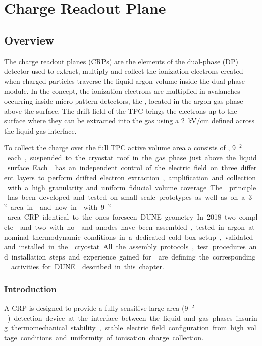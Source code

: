 \chapter{Charge Readout Plane}
\label{ch:dp-crp}
\section{Overview}
\label{ch:dp-crp-ov}

The charge readout planes (CRPs) are the elements of the dual-phase (DP) detector used to extract, multiply and collect the ionization electrons created when charged particles traverse the liquid argon volume inside the dual phase module.
In the \dual \lartpc concept, the ionization electrons are multiplied in avalanches  occurring inside micro-pattern detectors, the , located in the argon gas phase above the \lar  surface. The drift field of the TPC brings the electrons up to the \lar surface where they can  be    extracted into the gas using a \SI{2}{kV/cm} \efield defined across the liquid-gas interface.

To collect the charge over the full TPC active volume area a \dpmod consists of \dptotcrp {}, \SI{9}{\m$^{2}$}each,  suspended to the cryostat roof in the gas phase just  above the liquid surface. Each  has an independent control of the electric field on three different layers to perform drifted electron extraction, amplification and collection with a high granularity and uniform fiducial volume coverage.
The principle has been developed and tested on small scale prototypes as well as on a \SI{3}{\m$^{2}$} area in  and now in  with \SI{9}{\m$^{2}$} area CRP identical to the ones foreseen DUNE geometry.
In 2018 two complete  and two with no  and anodes have been assembled, tested in argon at nominal thermodynamic conditions in a dedicated cold box setup, validated and installed in the  cryostat. All the assembly protocols, test procedures and installation steps and experience gained for  are defining the corresponding  activities for DUNE \dpmod described in this chapter.

\subsection{Introduction}
\label{ch:dp-crp-intro}
A CRP is designed to provide a fully sensitive large area (\SI{9}{\m$^{2}$}) detection device at the interface between the liquid and gas phases insuring  thermomechanical stability, stable electric field configuration from high voltage conditions and uniformity of ionisation charge collection.   

